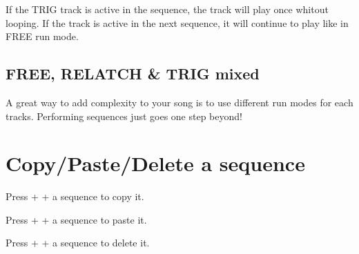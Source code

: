 If the TRIG track is active in the sequence, the track will play once whitout looping. If the track is active in the next sequence, it will continue to play like in FREE run mode.


\subsection{FREE, RELATCH \& TRIG mixed}

A great way to add complexity to your song is to use different run modes for each tracks. Performing sequences just goes one step beyond!



\section{Copy/Paste/Delete a sequence}

Press  +  + a sequence \padsicon{} to copy it.

Press  +  + a sequence \padsicon{} to paste it.

Press  +  + a sequence \padsicon{} to delete it.
